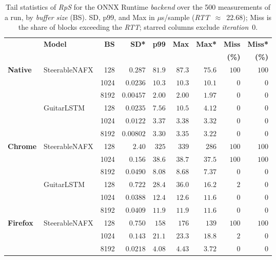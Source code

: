 \begin{table}[htbp]
\caption{Tail statistics of \emph{RpS} for the ONNX Runtime \emph{backend} over the 500 measurements of a run, by \emph{buffer size} (BS). SD, p99, and Max in $\mu$s/sample (\emph{RTT}~$\approx$~22.68); Miss is the share of blocks exceeding the \emph{RTT}; starred columns exclude \emph{iteration}~0.}
\label{tab:tails}
\centering
\setlength{\tabcolsep}{2pt}
\begin{tabular}{llrrrrrrr}
\toprule
& \textbf{Model} & \textbf{BS} & \textbf{SD*} & \textbf{p99} & \textbf{Max} & \textbf{Max*} & \textbf{Miss} & \textbf{Miss*} \\
& & & & & & & \textbf{(\%)} & \textbf{(\%)} \\
\midrule
  \multirow{6}{*}{\textbf{Native}} & \multirow{3}{*}{SteerableNAFX} & 128 & $0.287$ & $81.9$ & $87.3$ & $75.6$ & $100$ & $100$ \\
   &  & 1024 & $0.0236$ & $10.3$ & $10.3$ & $10.1$ & $0$ & $0$ \\
   &  & 8192 & $0.00457$ & $2.00$ & $2.00$ & $1.97$ & $0$ & $0$ \\
   & \multirow{3}{*}{GuitarLSTM} & 128 & $0.0235$ & $7.56$ & $10.5$ & $4.12$ & $0$ & $0$ \\
   &  & 1024 & $0.0122$ & $3.37$ & $3.38$ & $3.32$ & $0$ & $0$ \\
   &  & 8192 & $0.00802$ & $3.30$ & $3.35$ & $3.22$ & $0$ & $0$ \\
\midrule
  \multirow{6}{*}{\textbf{Chrome}} & \multirow{3}{*}{SteerableNAFX} & 128 & $2.40$ & $325$ & $339$ & $286$ & $100$ & $100$ \\
   &  & 1024 & $0.156$ & $38.6$ & $38.7$ & $37.5$ & $100$ & $100$ \\
   &  & 8192 & $0.0490$ & $8.08$ & $8.68$ & $7.37$ & $0$ & $0$ \\
   & \multirow{3}{*}{GuitarLSTM} & 128 & $0.722$ & $28.4$ & $36.0$ & $16.2$ & $2$ & $0$ \\
   &  & 1024 & $0.0388$ & $12.4$ & $12.6$ & $11.6$ & $0$ & $0$ \\
   &  & 8192 & $0.0409$ & $11.9$ & $11.9$ & $11.6$ & $0$ & $0$ \\
\midrule
  \multirow{6}{*}{\textbf{Firefox}} & \multirow{3}{*}{SteerableNAFX} & 128 & $0.750$ & $158$ & $176$ & $139$ & $100$ & $100$ \\
   &  & 1024 & $0.143$ & $21.1$ & $23.3$ & $18.8$ & $2$ & $0$ \\
   &  & 8192 & $0.0218$ & $4.08$ & $4.43$ & $3.72$ & $0$ & $0$ \\

\end{tabular}
\end{table}
